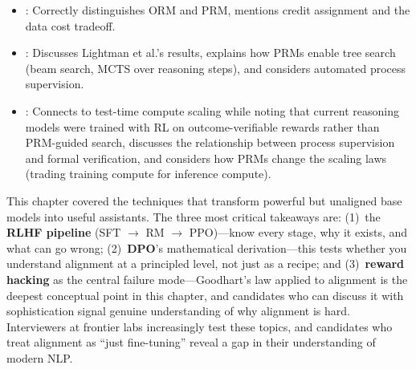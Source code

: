 \begin{interviewq}

\goodgreat
\begin{itemize}
\item {}: Correctly distinguishes ORM and PRM, mentions
  credit assignment and the data cost tradeoff.
\item {}: Discusses Lightman et al.'s results, explains
  how PRMs enable tree search (beam search, MCTS over reasoning steps),
  and considers automated process supervision.
\item {}: Connects to test-time compute scaling while noting
  that current reasoning models were trained with RL on outcome-verifiable
  rewards rather than PRM-guided search, discusses the relationship between
  process supervision and formal verification, and considers how PRMs
  change the scaling laws (trading training compute for inference compute).
\end{itemize}

\end{interviewq}

\bigskip
\begin{keyinsight}
This chapter covered the techniques that transform powerful but unaligned
base models into useful assistants.  The three most critical takeaways are:
(1)~the \textbf{RLHF pipeline} (SFT $\to$ RM $\to$ PPO)---know every
stage, why it exists, and what can go wrong; (2)~\textbf{DPO}'s
mathematical derivation---this tests whether you understand alignment
at a principled level, not just as a recipe; and (3)~\textbf{reward
hacking} as the central failure mode---Goodhart's law applied to
alignment is the deepest conceptual point in this chapter, and candidates
who can discuss it with sophistication signal genuine understanding of
why alignment is hard.  Interviewers at frontier labs increasingly test
these topics, and candidates who treat alignment as ``just fine-tuning''
reveal a gap in their understanding of modern NLP.
\end{keyinsight}
